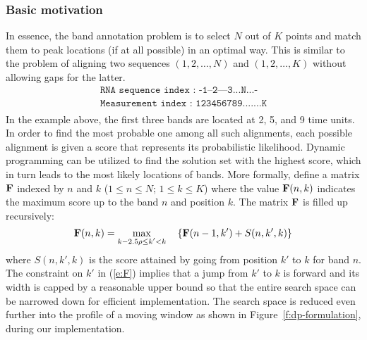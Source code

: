 \subsubsection{Basic motivation}
In essence, the band annotation problem is to select $N$ out of $K$ points and match them to peak locations (if at all possible) in an optimal way. This is similar to the problem of aligning two sequences $(1,2,\ldots,N)$ and $(1,2,\ldots,K)$ without allowing gaps for the latter.
\begin{align*}
\texttt{RNA sequence index    : -1--2---3...N...-}\\
\texttt{Measurement  index    : 123456789.......K}\\
\end{align*}
In the example above, the first three bands are located at 2, 5, and 9 time units. In order to find the most probable one among all such alignments, each possible alignment is given a score that represents its probabilistic likelihood. Dynamic programming can be utilized to find the solution set with the highest score, which in turn leads to the most likely locations of bands. More formally, define a matrix ${\mathbf{F}}$ indexed by $n$ and $k$ ($1 \le n \le N$; $1 \le k \le K$) where the value ${\mathbf{F}}(n,k)$ indicates the maximum score up to the band $n$ and position $k$. The matrix ${\mathbf{F}}$ is filled up recursively:
%
\begin{equation}\label{e:F}
{\mathbf{F}}(n,k) = \max_{\substack{k-2.5\rho \le k' < k}}\quad \left\{ {\mathbf{F}}(n-1,k') + S(n,k',k) \right\}
\end{equation}
%
where $S(n,k',k)$ is the score attained by going from position $k'$ to $k$ for band $n$. The constraint on $k'$ in (\ref{e:F}) implies that a jump from $k'$ to $k$ is forward and its width is capped by a reasonable upper bound so that the entire search space can be narrowed down for efficient implementation. The search space is reduced even further into the profile of a moving window as shown in Figure~\ref{f:dp-formulation}, during our implementation.

